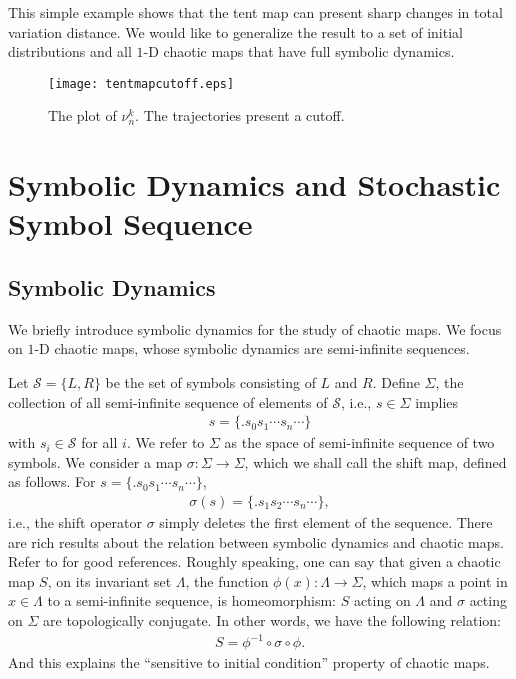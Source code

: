 This simple example shows that the tent map can present sharp changes in total variation distance. We would
like to generalize the result to a set of initial distributions and all $1$-D chaotic maps that have
full symbolic dynamics.



\begin{figure}
\centerline{{\texttt{[image: tentmapcutoff.eps]}}}
\caption{\label{tentmapcutoffplot} The plot of $\nu_n^k$. The trajectories present a cutoff.}
\end{figure}





\section{Symbolic Dynamics and Stochastic Symbol Sequence}
\label{sec:symdyn}
\subsection{Symbolic Dynamics}
We briefly introduce symbolic dynamics for the study of chaotic maps. We focus on $1$-D chaotic maps, whose symbolic dynamics are semi-infinite sequences. 

Let $\mathcal{S}=\{L, R\}$ be the set of symbols consisting of $L$ and $R$. Define $\Sigma$, the collection of all semi-infinite sequence of elements of $\mathcal{S}$, i.e., $s\in \Sigma$ implies
 \begin{eqnarray}
 s= \{.s_0s_1\cdots s_n\cdots\}
 \end{eqnarray}
with $s_i\in \mathcal{S}$ for all $i$. We refer to $\Sigma$ as the space of semi-infinite sequence of two symbols. We consider a map $\sigma:\Sigma \to \Sigma$, which we shall call the shift map, defined as follows. For $s= \{.s_0s_1\cdots s_n\cdots\}$,
 \begin{eqnarray}
 \sigma(s)= \{.s_1s_2\cdots s_n\cdots\},
 \end{eqnarray}
i.e., the shift operator $\sigma$ simply deletes the first element of the sequence. There are rich results about the relation between symbolic dynamics and chaotic maps. Refer to \cite{Wiggins1990, Holmes1983} for good references. Roughly speaking, one can say that given a chaotic map $S$, on its invariant set $\Lambda$, the function $\phi(x): \Lambda \to \Sigma$, which maps a point in $x\in \Lambda$ to a semi-infinite sequence, is homeomorphism: $S$ acting on $\Lambda$ and $\sigma$ acting on $\Sigma$ are topologically conjugate. In other words, we have the following relation:
 \begin{eqnarray}
 S = \phi^{-1}\circ \sigma \circ \phi.
 \end{eqnarray}
And this explains the ``sensitive to initial condition'' property of chaotic maps.

